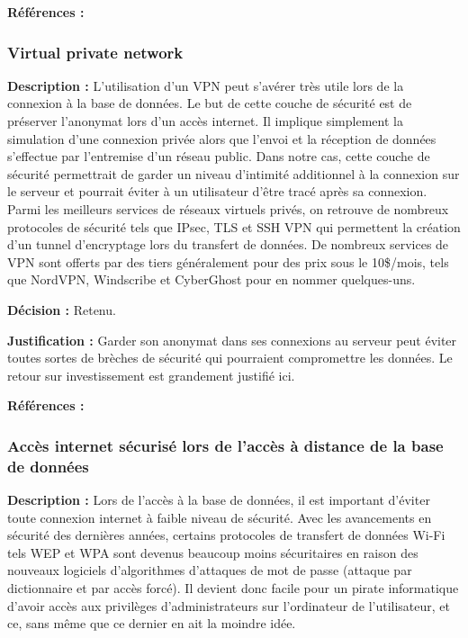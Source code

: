 \textbf{Références :} \cite{encryptage hybride}

\subsubsection{Virtual private network}

\textbf{Description :} L’utilisation d’un VPN peut s’avérer très utile lors de la connexion à la base de données. Le but de cette couche de sécurité est de préserver l’anonymat lors d’un accès internet. Il implique simplement la simulation d’une connexion privée alors que l’envoi et la réception de données s’effectue par l’entremise d’un réseau public. Dans notre cas, cette couche de sécurité permettrait de garder un niveau d’intimité additionnel à la connexion sur le serveur et pourrait éviter à un utilisateur d’être tracé après sa connexion. Parmi les meilleurs services de réseaux virtuels privés, on retrouve de nombreux protocoles de sécurité tels que IPsec, TLS et SSH VPN qui permettent la création d’un tunnel d’encryptage lors du transfert de données. De nombreux services de VPN sont offerts par des tiers généralement pour des prix sous le 10\$/mois, tels que NordVPN, Windscribe et CyberGhost pour en nommer quelques-uns.

\textbf{Décision :} Retenu.

\textbf{Justification :} Garder son anonymat dans ses connexions au serveur peut éviter toutes sortes de brèches de sécurité qui pourraient compromettre les données. Le retour sur investissement est grandement justifié ici.

\textbf{Références :} \cite{vpn} \cite{juniper}

\subsubsection{Accès internet sécurisé lors de l’accès à distance de la base de données}

\textbf{Description :} Lors de l’accès à la base de données, il est important d’éviter toute connexion internet à faible niveau de sécurité. Avec les avancements en sécurité des dernières années, certains protocoles de transfert de données Wi-Fi tels WEP et WPA sont devenus beaucoup moins sécuritaires en raison des nouveaux logiciels d’algorithmes d’attaques de mot de passe (attaque par dictionnaire et par accès forcé). Il devient donc facile pour un pirate informatique d’avoir accès aux privilèges d’administrateurs sur l’ordinateur de l’utilisateur, et ce, sans même que ce dernier en ait la moindre idée.


